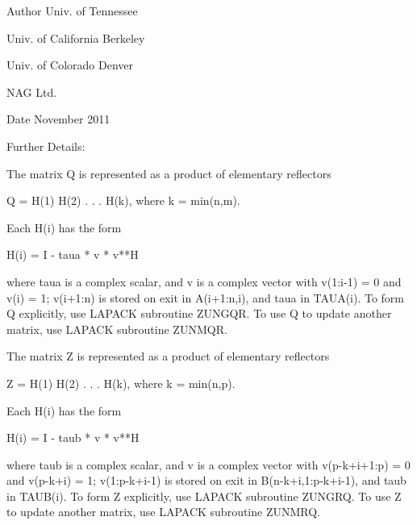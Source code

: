 \begin{DoxyAuthor}{Author}
Univ. of Tennessee 

Univ. of California Berkeley 

Univ. of Colorado Denver 

N\+A\+G Ltd. 
\end{DoxyAuthor}
\begin{DoxyDate}{Date}
November 2011 
\end{DoxyDate}
\begin{DoxyParagraph}{Further Details\+: }
\begin{DoxyVerb}  The matrix Q is represented as a product of elementary reflectors

     Q = H(1) H(2) . . . H(k), where k = min(n,m).

  Each H(i) has the form

     H(i) = I - taua * v * v**H

  where taua is a complex scalar, and v is a complex vector with
  v(1:i-1) = 0 and v(i) = 1; v(i+1:n) is stored on exit in A(i+1:n,i),
  and taua in TAUA(i).
  To form Q explicitly, use LAPACK subroutine ZUNGQR.
  To use Q to update another matrix, use LAPACK subroutine ZUNMQR.

  The matrix Z is represented as a product of elementary reflectors

     Z = H(1) H(2) . . . H(k), where k = min(n,p).

  Each H(i) has the form

     H(i) = I - taub * v * v**H

  where taub is a complex scalar, and v is a complex vector with
  v(p-k+i+1:p) = 0 and v(p-k+i) = 1; v(1:p-k+i-1) is stored on exit in
  B(n-k+i,1:p-k+i-1), and taub in TAUB(i).
  To form Z explicitly, use LAPACK subroutine ZUNGRQ.
  To use Z to update another matrix, use LAPACK subroutine ZUNMRQ.\end{DoxyVerb}
 
\end{DoxyParagraph}
